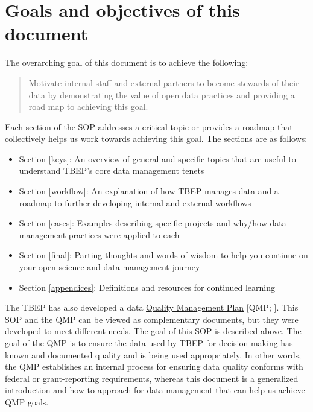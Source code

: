 \documentclass[
]{book}
\providecommand{\tightlist}{%
  \setlength{\itemsep}{0pt}\setlength{\parskip}{0pt}}
\begin{document}
\section{Goals and objectives of this document}\label{goals-and-objectives-of-this-document}

The overarching goal of this document is to achieve the following:

\begin{quote}
Motivate internal staff and external partners to become stewards of their data by demonstrating the value of open data practices and providing a road map to achieving this goal.
\end{quote}

Each section of the SOP addresses a critical topic or provides a roadmap that collectively helps us work towards achieving this goal. The sections are as follows:

\begin{itemize}
\tightlist
\item
  Section \ref{keys}: An overview of general and specific topics that are useful to understand TBEP's core data management tenets
\item
  Section \ref{workflow}: An explanation of how TBEP manages data and a roadmap to further developing internal and external workflows
\item
  Section \ref{cases}: Examples describing specific projects and why/how data management practices were applied to each
\item
  Section \ref{final}: Parting thoughts and words of wisdom to help you continue on your open science and data management journey
\item
  Section \ref{appendices}: Definitions and resources for continued learning
\end{itemize}

The TBEP has also developed a data \href{https://drive.google.com/file/d/1DyA0PNHV8rEXGMwGiyS7sXY1ECLYpJJO/view}{Quality Management Plan} {[}QMP; \citet{tbep1620}{]}. This SOP and the QMP can be viewed as complementary documents, but they were developed to meet different needs. The goal of this SOP is described above. The goal of the QMP is to ensure the data used by TBEP for decision-making has known and documented quality and is being used appropriately. In other words, the QMP establishes an internal process for ensuring data quality conforms with federal or grant-reporting requirements, whereas this document is a generalized introduction and how-to approach for data management that can help us achieve QMP goals.
\end{document}
